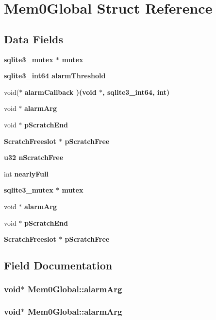 \section{Mem0Global Struct Reference}
\label{structMem0Global}
\subsection*{Data Fields}
\begin{CompactItemize}
\item 
\bf{sqlite3\_\-mutex} $\ast$ \bf{mutex}
\item 
\bf{sqlite3\_\-int64} \bf{alarm\-Threshold}
\item 
void($\ast$ \bf{alarm\-Callback} )(void $\ast$, \bf{sqlite3\_\-int64}, int)
\item 
void $\ast$ \bf{alarm\-Arg}
\item 
void $\ast$ \bf{p\-Scratch\-End}
\item 
\bf{Scratch\-Freeslot} $\ast$ \bf{p\-Scratch\-Free}
\item 
\bf{u32} \bf{n\-Scratch\-Free}
\item 
int \bf{nearly\-Full}
\item 
\bf{sqlite3\_\-mutex} $\ast$ \bf{mutex}
\item 
void $\ast$ \bf{alarm\-Arg}
\item 
void $\ast$ \bf{p\-Scratch\-End}
\item 
\bf{Scratch\-Freeslot} $\ast$ \bf{p\-Scratch\-Free}
\end{CompactItemize}


\subsection{Field Documentation}
\subsubsection{\setlength{\rightskip}{0pt plus 5cm}void$\ast$ \bf{Mem0Global::alarm\-Arg}}\label{structMem0Global_cb58ec9f717d80245348efcfc9e8c847}


\subsubsection{\setlength{\rightskip}{0pt plus 5cm}void$\ast$ \bf{Mem0Global::alarm\-Arg}}\label{structMem0Global_cb58ec9f717d80245348efcfc9e8c847}


